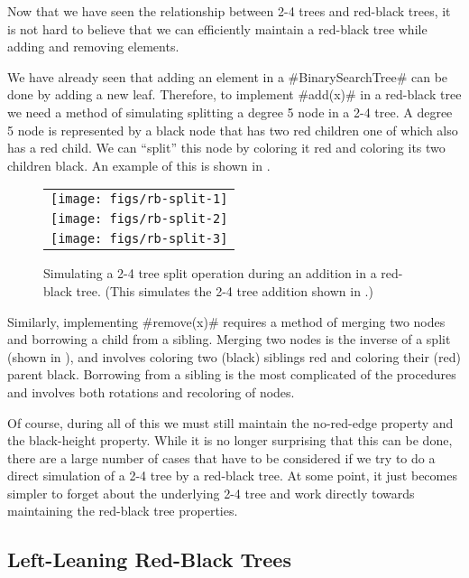 Now that we have seen the relationship between 2-4 trees and
red-black trees, it is not hard to believe that we can efficiently
maintain a red-black tree while adding and removing elements.  

We have already seen that adding an element in a #BinarySearchTree#
can be done by adding a new leaf.  Therefore, to implement #add(x)# in a
red-black tree we need a method of simulating splitting a degree 5 node
in a 2-4 tree.  A degree 5 node is represented by a black node that has
two red children one of which also has a red child. We can ``split''
this node by coloring it red and coloring its two children black.
An example of this is shown in .

\begin{figure}
  \begin{center}
   \begin{tabular}{c}
     \texttt{[image: figs/rb-split-1]} \\
     \texttt{[image: figs/rb-split-2]} \\
     \texttt{[image: figs/rb-split-3]} \\
   \end{tabular}
  \end{center}
  \caption{Simulating a 2-4 tree split operation during an addition in a
    red-black tree.  (This simulates the 2-4 tree addition shown in .)}
\end{figure}

Similarly, implementing #remove(x)# requires a method of merging two
nodes and borrowing a child from a sibling.  Merging two nodes is the
inverse of a split (shown in ), and involves coloring
two (black) siblings red and coloring their (red) parent black.
Borrowing from a sibling is the most complicated of the procedures and involves both rotations and recoloring of nodes.

Of course, during all of this we must still maintain the no-red-edge
property and the black-height property.  While it is no longer surprising
that this can be done, there are a large number of cases that have to
be considered if we try to do a direct simulation of a 2-4 tree by
a red-black tree.  At some point, it just becomes simpler to forget
about the underlying 2-4 tree and work directly towards maintaining the
red-black tree properties.

\subsection{Left-Leaning Red-Black Trees}

